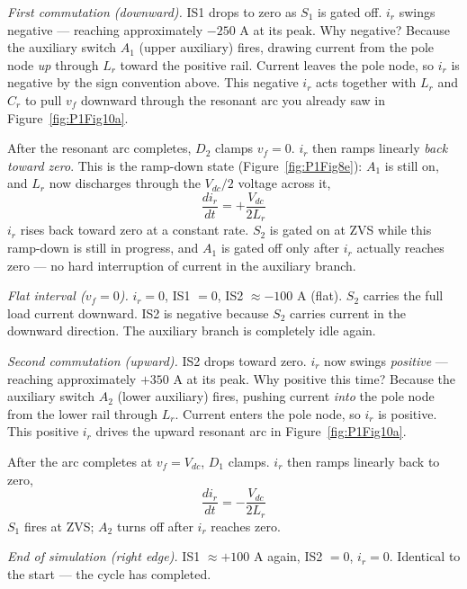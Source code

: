 \documentclass[12pt, a4paper]{article}
\def\,{ }%
\newcommand{\Vdc}{V_{dc}}
\newcommand{\vf}{v_f}
\newcommand{\ir}{i_r}
\newcommand{\Lr}{L_r}
\newcommand{\Cr}{C_r}
\newcommand{\figref}[1]{Figure~\ref{#1}}
\begin{document}
\textit{First commutation (downward).}
IS1 drops to zero as $S_1$ is gated off.
$\ir$ swings negative --- reaching approximately $-250$\,A at its peak.
Why negative?
Because the auxiliary switch $A_1$ (upper auxiliary) fires, drawing current
from the pole node \emph{up} through $\Lr$ toward the positive rail.
Current leaves the pole node, so $\ir$ is negative by the sign convention
above.
This negative $\ir$ acts together with $\Lr$ and $\Cr$ to pull $\vf$
downward through the resonant arc you already saw in \figref{fig:P1Fig10a}.

After the resonant arc completes, $D_2$ clamps $\vf = 0$.
$\ir$ then ramps linearly \emph{back toward zero}.
This is the ramp-down state (\figref{fig:P1Fig8e}): $A_1$ is still on,
and $\Lr$ now discharges through the $\Vdc/2$ voltage across it,
\begin{equation}
    \frac{d\ir}{dt} = +\frac{\Vdc}{2\Lr}
    \label{eq:ir_rampdown_down_Fig10}
\end{equation}
$\ir$ rises back toward zero at a constant rate.
$S_2$ is gated on at ZVS while this ramp-down is still in progress, and
$A_1$ is gated off only after $\ir$ actually reaches zero --- no
hard interruption of current in the auxiliary branch.

\textit{Flat interval ($\vf = 0$).}
$\ir = 0$, IS1 $= 0$, IS2 $\approx -100$\,A (flat).
$S_2$ carries the full load current downward.
IS2 is negative because $S_2$ carries current in the downward direction.
The auxiliary branch is completely idle again.

\textit{Second commutation (upward).}
IS2 drops toward zero.
$\ir$ now swings \emph{positive} --- reaching approximately $+350$\,A at
its peak.
Why positive this time?
Because the auxiliary switch $A_2$ (lower auxiliary) fires, pushing current
\emph{into} the pole node from the lower rail through $\Lr$.
Current enters the pole node, so $\ir$ is positive.
This positive $\ir$ drives the upward resonant arc in \figref{fig:P1Fig10a}.

After the arc completes at $\vf = \Vdc$, $D_1$ clamps.
$\ir$ then ramps linearly back to zero,
\begin{equation}
    \frac{d\ir}{dt} = -\frac{\Vdc}{2\Lr}
    \label{eq:ir_rampdown_up_Fig10}
\end{equation}
$S_1$ fires at ZVS; $A_2$ turns off after $\ir$ reaches zero.

\textit{End of simulation (right edge).}
IS1 $\approx +100$\,A again, IS2 $= 0$, $\ir = 0$.
Identical to the start --- the cycle has completed.
\end{document}
